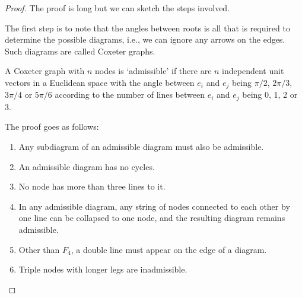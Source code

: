\documentclass[10pt,a4paper]{article}
\begin{document}
\begin{proof}
The proof is long but we can sketch the steps involved.

The first step is to note that the angles between roots is all that is required to determine the possible diagrams, i.e., we can ignore any arrows on the edges. Such diagrams are called Coxeter graphs.

A Coxeter graph with $n$ nodes is `admissible' if there are $n$
independent unit vectors in a Euclidean space with the angle between
$e_i$ and $e_j$ being $\pi/2$, $2 \pi/3$, $3 \pi/4$ or $5 \pi/6$ according to the number of lines between $e_i$ and $e_j$ being 0, 1, 2 or 3.

The proof goes as follows:

\begin{enumerate}
\item Any subdiagram of an admissible diagram must also be admissible.
\item An admissible diagram has no cycles.
\item No node has more than three lines to it.
\item In any admissible diagram, any string of nodes connected to each
  other by one line can be collapsed to one node, and the resulting
  diagram remains admissible.
\item Other than $F_4$, a double line must appear on the edge of a
  diagram.
\item Triple nodes with longer legs are inadmissible.
\end{enumerate}

\end{proof}
\end{document}
